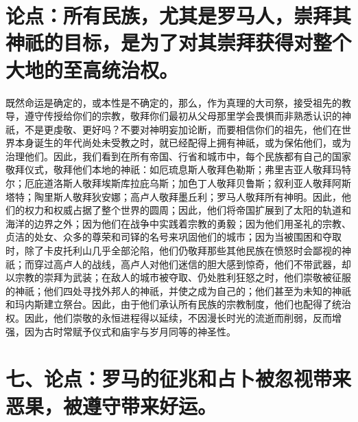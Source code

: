 
\section{论点：所有民族，尤其是罗马人，崇拜其神祇的目标，是为了对其崇拜获得对整个大地的至高统治权。}

既然命运是确定的，或本性是不确定的，那么，作为真理的大司祭，接受祖先的教导，遵守传授给你们的宗教，敬拜你们最初从父母那里学会畏惧而非熟悉认识的神祇，不是更虔敬、更好吗？不要对神明妄加论断，而要相信你们的祖先，他们在世界本身诞生的年代尚处未受教之时，就已经配得上拥有神祇，或为保佑他们，或为治理他们。因此，我们看到在所有帝国、行省和城市中，每个民族都有自己的国家敬拜仪式，敬拜他们本地的神祇：如厄琉息斯人敬拜色勒斯；弗里吉亚人敬拜玛特尔；厄庇道洛斯人敬拜埃斯库拉庇乌斯；加色丁人敬拜贝鲁斯；叙利亚人敬拜阿斯塔特；陶里斯人敬拜狄安娜；高卢人敬拜墨丘利；罗马人敬拜所有神明。因此，他们的权力和权威占据了整个世界的圆周；因此，他们将帝国扩展到了太阳的轨道和海洋的边界之外；因为他们在战争中实践着宗教的勇毅；因为他们用圣礼的宗教、贞洁的处女、众多的尊荣和司铎的名号来巩固他们的城市；因为当被围困和夺取时，除了卡皮托利山几乎全部沦陷，他们仍敬拜那些其他民族在愤怒时会鄙视的神祇；而穿过高卢人的战线，高卢人对他们迷信的胆大感到惊奇，他们不带武器，却以宗教的崇拜为武装；在敌人的城市被夺取、仍处胜利狂怒之时，他们崇敬被征服的神祇；他们四处寻找外邦人的神祇，并使之成为自己的；他们甚至为未知的神祇和玛内斯建立祭台。因此，由于他们承认所有民族的宗教制度，他们也配得了统治权。因此，他们崇敬的永恒进程得以延续，不因漫长时光的流逝而削弱，反而增强，因为古时常赋予仪式和庙宇与岁月同等的神圣性。\par


\section{七、论点：罗马的征兆和占卜被忽视带来恶果，被遵守带来好运。}

